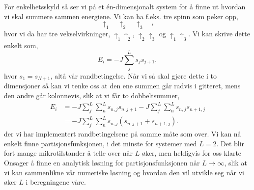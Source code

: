 \documentclass[norsk, 10pt]{article}
\begin{document}
For enkelhetsskyld så ser vi på et én-dimensjonalt system for å finne ut hvordan vi skal summere sammen energiene. Vi kan ha f.eks. tre spinn som peker opp,
$$ \uparrow_1\quad\uparrow_2\quad\uparrow_3\quad, $$
hvor vi da har tre vekselvirkninger, $\uparrow_1\uparrow_2$, $\uparrow_2\uparrow_3$ og $\uparrow_1\uparrow_3$. Vi kan skrive dette enkelt som,
$$ E_i = -J\sum\limits_{j}^{L} s_js_{j+1}, $$
hvor $s_1 = s_{N+1}$, altå vår randbetingelse. Når vi så skal gjøre dette i to dimensjoner så kan vi tenke oss at den ene summen går radvis i gitteret, mens den andre går kolonnevis, slik at vi får to dobbeltsummer,
\begin{align*}
	E_i &= -J\sum\limits_{j}^{L}\sum\limits_{n}^{L} s_{n,j}s_{n,j+1} - J\sum\limits_{j}^{L}\sum\limits_{n}^{L} s_{n,j}s_{n+1,j}\\
	&= -J\sum\limits_{j}^{L}\sum\limits_{n}^{L} s_{n,j}(s_{n,j+1} + s_{n+1,j}).
\end{align*}
der vi har implementert randbetingelsene på samme måte som over. Vi kan nå enkelt finne partisjonsfunksjonen, i det minste for systemer med $L=2$. Det blir fort mange mikrotilstander å telle over når $L$ øker, men heldigvis for oss klarte Onsager å finne en analytisk løsning for partisjonsfunksjonen når $L\to\infty$, slik at vi kan sammenlikne vår numeriske løsning og hvordan den vil utvikle seg når vi øker $L$ i beregningene våre.
\end{document}
